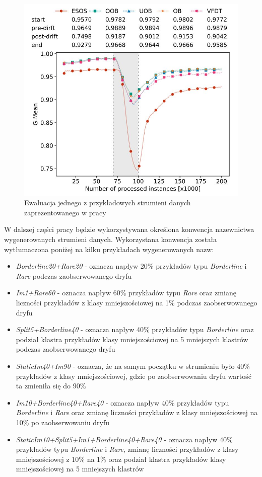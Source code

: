 \begin{figure}[h]
    \centering
    \includegraphics[width=13cm]{figures/drift_example.JPG}
    \caption{Ewaluacja jednego z przykładowych strumieni danych zaprezentowanego w pracy \cite{Article:TypyPrzykladow}}\label{Figure:DriftExample}
\end{figure}

W dalszej części pracy będzie wykorzystywana określona konwencja nazewnictwa wygenerowanych strumieni danych. Wykorzystana konwencja została wytłumaczona poniżej na kilku przykładach wygenerowanych nazw:

\begin{itemize}
    \item \textit{Borderline20+Rare20} - oznacza napływ 20\% przykładów typu \textit{Borderline} i \textit{Rare} podczas zaobserwowanego dryfu
    \item \textit{Im1+Rare60} - oznacza napływ 60\% przykładów typu \textit{Rare} oraz zmianę liczności przykładów z klasy mniejszościowej na 1\% podczas zaobserwowanego dryfu
    \item \textit{Split5+Borderline40} - oznacza napływ 40\% przykładów typu \textit{Borderline} oraz podział klastra przykładów klasy mniejszościowej na 5 mniejszych klastrów podczas zaobserwowanego dryfu
    \item \textit{StaticIm40+Im90} - oznacza, że na samym początku w strumieniu było 40\% przykładów z klasy mniejszościowej, gdzie po zaobserwowaniu dryfu wartość ta zmieniła się do 90\%
    \item \textit{Im10+Borderline40+Rare40} - oznacza napływ 40\% przykładów typu \textit{Borderline} i \textit{Rare} oraz zmianę liczności przykładów z klasy mniejszościowej na 10\% po zaobserwowaniu dryfu
    \item \textit{StaticIm10+Split5+Im1+Borderline40+Rare40} - oznacza napływ 40\% przykładów typu \textit{Borderline} i \textit{Rare}, zmianę liczności przykładów z klasy mniejszościowej z 10\% na 1\% oraz podział klastra przykładów klasy mniejszościowej na 5 mniejszych klastrów
\end{itemize}
